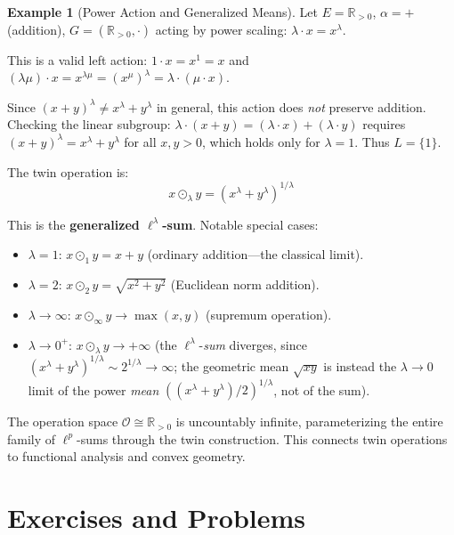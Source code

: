 \documentclass[11pt,a4paper,openany]{book}
\theoremstyle{plain}
\theoremstyle{definition}
\newtheorem{example}[theorem]{Example}
\newcommand{\twing}[1]{\odot_{#1}}
\newcommand{\opspace}{\mathcal{O}}
\newcommand{\lingroup}{L}
\newcommand{\actspace}{E}
\newcommand{\groupG}{G}
\newcommand{\RR}{\mathbb{R}}
\begin{document}
\begin{example}[Power Action and Generalized Means]\label{ex:power-action}
Let $\actspace = \RR_{>0}$, $\alpha = +$ (addition), $\groupG = (\RR_{>0}, \cdot)$ acting by power scaling: $\lambda \cdot x = x^\lambda$.

This is a valid left action: $1 \cdot x = x^1 = x$ and $(\lambda\mu) \cdot x = x^{\lambda\mu} = (x^\mu)^\lambda = \lambda \cdot (\mu \cdot x)$.

Since $(x + y)^\lambda \neq x^\lambda + y^\lambda$ in general, this action does \emph{not} preserve addition. Checking the linear subgroup: $\lambda \cdot (x + y) = (\lambda \cdot x) + (\lambda \cdot y)$ requires $(x + y)^\lambda = x^\lambda + y^\lambda$ for all $x, y > 0$, which holds only for $\lambda = 1$. Thus $\lingroup = \{1\}$.

The twin operation is:
\[
x \twing{\lambda} y = (x^\lambda + y^\lambda)^{1/\lambda}
\]

This is the \textbf{generalized $\ell^\lambda$-sum}. Notable special cases:
\begin{itemize}
    \item $\lambda = 1$: $x \twing{1} y = x + y$ (ordinary addition---the classical limit).
    \item $\lambda = 2$: $x \twing{2} y = \sqrt{x^2 + y^2}$ (Euclidean norm addition).
    \item $\lambda \to \infty$: $x \twing{\infty} y \to \max(x, y)$ (supremum operation).
    \item $\lambda \to 0^+$: $x \twing{\lambda} y \to +\infty$ (the $\ell^\lambda$-\emph{sum} diverges, since $(x^\lambda+y^\lambda)^{1/\lambda}\sim 2^{1/\lambda}\to\infty$; the geometric mean $\sqrt{xy}$ is instead the $\lambda\to0$ limit of the power \emph{mean} $((x^\lambda+y^\lambda)/2)^{1/\lambda}$, not of the sum).
\end{itemize}

The operation space $\opspace \cong \RR_{>0}$ is uncountably infinite, parameterizing the entire family of $\ell^p$-sums through the twin construction. This connects twin operations to functional analysis and convex geometry.
\end{example}



\chapter{Exercises and Problems}
\label{ch:exercises}
\end{document}
